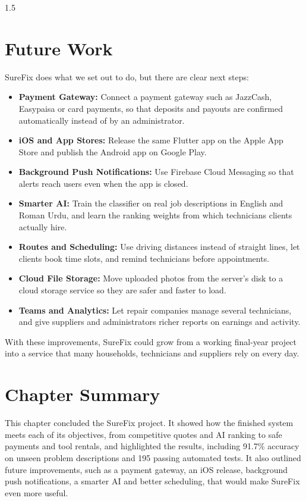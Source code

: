 \documentclass[A4paper,12pt]{report}
\theoremstyle{plain}
\theoremstyle{definition}
\theoremstyle{remark}
\numberwithin{equation}{section}
\begin{document}
\begin{spacing}{1.5}
\section{Future Work}

SureFix does what we set out to do, but there are clear next steps:

\begin{itemize}
    \item \textbf{Payment Gateway:} Connect a payment gateway such as JazzCash, Easypaisa or card payments, so that deposits and payouts are confirmed automatically instead of by an administrator.
    \item \textbf{iOS and App Stores:} Release the same Flutter app on the Apple App Store and publish the Android app on Google Play.
    \item \textbf{Background Push Notifications:} Use Firebase Cloud Messaging so that alerts reach users even when the app is closed.
    \item \textbf{Smarter AI:} Train the classifier on real job descriptions in English and Roman Urdu, and learn the ranking weights from which technicians clients actually hire.
    \item \textbf{Routes and Scheduling:} Use driving distances instead of straight lines, let clients book time slots, and remind technicians before appointments.
    \item \textbf{Cloud File Storage:} Move uploaded photos from the server's disk to a cloud storage service so they are safer and faster to load.
    \item \textbf{Teams and Analytics:} Let repair companies manage several technicians, and give suppliers and administrators richer reports on earnings and activity.
\end{itemize}

With these improvements, SureFix could grow from a working final-year project into a service that many households, technicians and suppliers rely on every day.

\section{Chapter Summary}

This chapter concluded the SureFix project. It showed how the finished system meets each of its objectives, from competitive quotes and AI ranking to safe payments and tool rentals, and highlighted the results, including 91.7\% accuracy on unseen problem descriptions and 195 passing automated tests. It also outlined future improvements, such as a payment gateway, an iOS release, background push notifications, a smarter AI and better scheduling, that would make SureFix even more useful.


\end{spacing}
\end{document}
